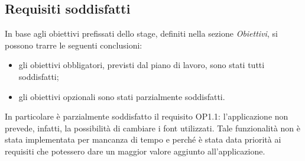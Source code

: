 \documentclass[../Tesi.tex]{subfiles}
\begin{document}
	\subsection{Requisiti soddisfatti}
	In base agli obiettivi prefissati dello stage, definiti nella sezione \textit{Obiettivi}, si possono trarre le seguenti conclusioni:
	\begin{itemize}
		\item gli obiettivi obbligatori, previsti dal piano di lavoro, sono stati tutti soddisfatti;
		\item gli obiettivi opzionali sono stati parzialmente soddisfatti.
	\end{itemize}
	In particolare è parzialmente soddisfatto il requisito OP1.1: l'applicazione non prevede, infatti, la possibilità di cambiare i font utilizzati. Tale funzionalità non è stata implementata per mancanza di tempo e perché è stata data priorità ai requisiti che potessero dare un maggior valore aggiunto all'applicazione.
\end{document}
